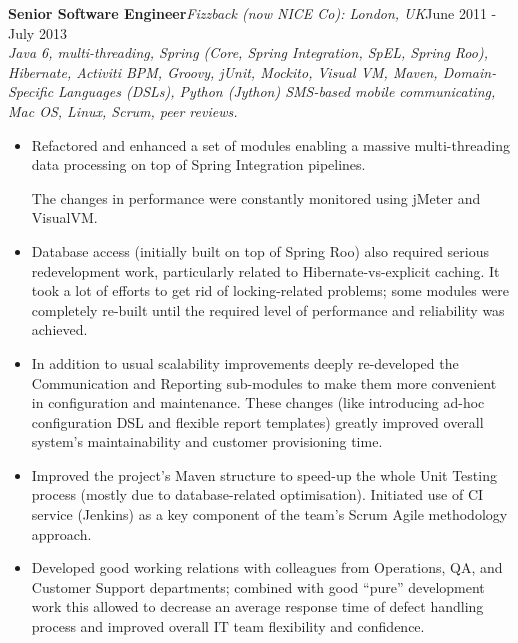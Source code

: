 \documentclass{res}
\newcommand{\jobdes}[4]{\needspace{3\baselineskip}%
{\noindent \bf #3\hspace{2ex}}{{\em \small #1}}{\hfill #2}\\{{\em \small #4.}}}
\newif\ifFullVersion
\begin{document}
\begin{resume}
\jobdes{Fizzback (now NICE Co): London, UK} {June 2011 - July 2013}{Senior Software Engineer}
{Java 6, multi-threading, Spring (Core, Spring Integration, SpEL, Spring Roo), Hibernate, Activiti BPM, Groovy, jUnit, Mockito, Visual VM, Maven, Domain-Specific Languages (DSLs), Python (Jython) SMS-based mobile communicating, Mac OS, Linux, Scrum, peer reviews}
\begin{itemize} \itemsep -2pt %
 \item Refactored and enhanced a set of modules enabling a massive multi-threading data processing on top of Spring Integration pipelines.
\ifFullVersion
While for some modules it was enough to re-code the critical pieces with the standard “stateless or immutable” approach, the main part of existed system required deep re-design based on Enterprise Integration Patterns (EIP) messaging-based architecture and extensive use of Java multi-threading tools.
\fi
The changes in performance were constantly monitored using jMeter and VisualVM.
 \item Database access (initially built on top of Spring Roo) also required serious redevelopment work, particularly related to Hibernate-vs-explicit caching. It took a lot of efforts to get rid of locking-related problems; some modules were completely re-built until the required level of performance and reliability was achieved.
 \item In addition to usual scalability improvements deeply re-developed the Communication and Reporting sub-modules to make them more convenient in configuration and maintenance. These changes (like introducing ad-hoc configuration DSL and flexible report templates) greatly improved overall system's maintainability and customer provisioning time.
 \item 	Improved the project’s Maven structure to speed-up the whole Unit Testing process (mostly due to database-related optimisation). Initiated use of CI service (Jenkins) as a key component of the team’s Scrum Agile methodology approach.
 \item Developed good working relations with colleagues from Operations, QA, and Customer Support departments; combined with good ``pure'' development work this allowed to decrease an average response time of defect handling process and improved overall IT team flexibility and confidence.
\end{itemize}


\end{resume}
\end{document}
